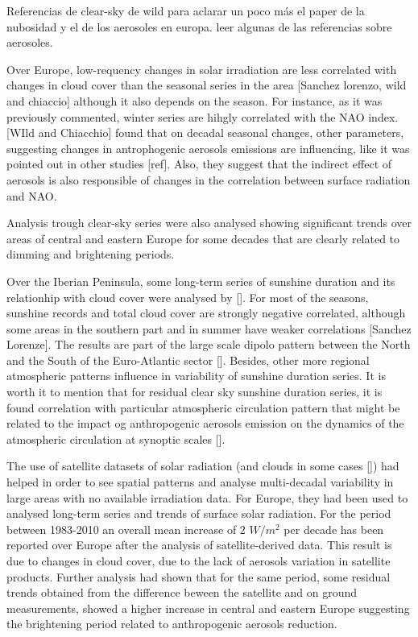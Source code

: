 {\color{red} Referencias de clear-sky de wild para aclarar un poco más el paper de la nubosidad y el de los aerosoles en europa. leer algunas de las referencias sobre aerosoles.}

Over Europe, low-requency changes in solar irradiation are less correlated with changes in cloud cover than the seasonal series in the area [Sanchez lorenzo, wild and chiaccio] although it also depends on the season. For instance, as it was previously commented, winter series are hihgly correlated with the NAO index. [WIld and Chiacchio] found that on decadal seasonal changes, other parameters, suggesting changes in antrophogenic aerosols emissions are influencing, like it was pointed out in other studies [ref]. Also, they suggest that the indirect effect of aerosols is also responsible of changes in the correlation between surface radiation and NAO.

Analysis trough clear-sky series were also analysed showing significant trends over areas of central and eastern Europe for some decades that are clearly related to dimming and brightening periods.


Over the Iberian Peninsula, some long-term series of sunshine duration and its relationhip with cloud cover were analysed by []. For most of the seasons, sunshine records and total cloud cover are strongly negative correlated, although some areas in the southern part and in summer have weaker correlations [Sanchez Lorenze]. The results are part of the large scale dipolo pattern between the North and the South of the Euro-Atlantic sector []. Besides, other more regional atmospheric patterns influence in variability of sunshine duration series. It is worth it to mention that for residual clear sky sunshine duration series, it is found correlation with particular atmospheric circulation pattern that might be related to the impact og anthropogenic aerosols emission on the dynamics of the atmospheric circulation at synoptic scales [].

The use of satellite datasets of solar radiation (and clouds in some cases []) had helped in order to see spatial patterns and analyse multi-decadal variability in large areas with no available irradiation data. For Europe, they had been used to analysed long-term series and trends of surface solar radiation. For the period between 1983-2010 an overall mean increase of 2 $W/m^2$ per decade has been reported over Europe after the analysis of satellite-derived data. This result is due to changes in cloud cover, due to the lack of aerosols variation in satellite products. Further analysis had shown that for the same period, some residual trends obtained from the difference beween the satellite and on ground measurements, showed a higher increase in central and eastern Europe suggesting the brightening period related to anthropogenic aerosols reduction.

